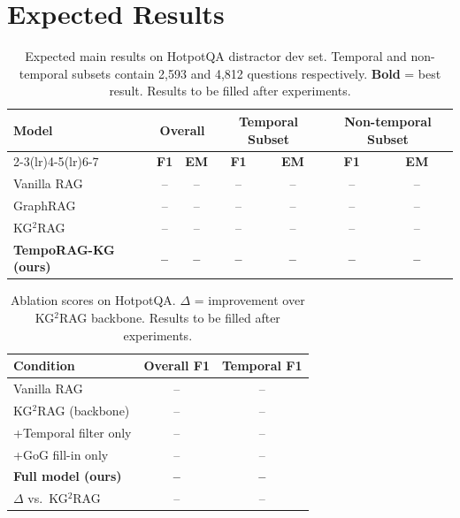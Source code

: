 \documentclass[11pt]{article}
\begin{document}
\section{Expected Results}

\begin{table}[t]
  \centering
  \small
  \begin{tabular}{lcccccc}
    \toprule
    \multirow{2}{*}{\textbf{Model}} &
    \multicolumn{2}{c}{\textbf{Overall}} &
    \multicolumn{2}{c}{\textbf{Temporal Subset}} &
    \multicolumn{2}{c}{\textbf{Non-temporal Subset}} \\
    \cmidrule(lr){2-3}\cmidrule(lr){4-5}\cmidrule(lr){6-7}
    & \textbf{F1} & \textbf{EM}
    & \textbf{F1} & \textbf{EM}
    & \textbf{F1} & \textbf{EM} \\
    \midrule
    Vanilla RAG                     & -- & -- & -- & -- & -- & -- \\
    GraphRAG \cite{edge2024graphrag} & -- & -- & -- & -- & -- & -- \\
    KG$^2$RAG \cite{zhu2025kg2rag}  & -- & -- & -- & -- & -- & -- \\
    \midrule
    \textbf{TempoRAG-KG (ours)}     & \textbf{--} & \textbf{--}
                                    & \textbf{--} & \textbf{--}
                                    & \textbf{--} & \textbf{--} \\
    \bottomrule
  \end{tabular}
  \caption{Expected main results on HotpotQA distractor dev set.
  Temporal and non-temporal subsets contain 2,593 and 4,812 questions
  respectively. \textbf{Bold} = best result. Results to be filled
  after experiments.}
  \label{tab:main_results}
\end{table}

\begin{table}[t]
  \centering
  \small
  \begin{tabular}{lcc}
    \toprule
    \textbf{Condition} & \textbf{Overall F1} & \textbf{Temporal F1} \\
    \midrule
    Vanilla RAG                     & -- & -- \\
    KG$^2$RAG (backbone)            & -- & -- \\
    \quad +Temporal filter only     & -- & -- \\
    \quad +GoG fill-in only         & -- & -- \\
    \quad \textbf{Full model (ours)}& \textbf{--} & \textbf{--} \\
    \midrule
    $\Delta$ vs.\ KG$^2$RAG        & --  & -- \\
    \bottomrule
  \end{tabular}
  \caption{Ablation scores on HotpotQA.
  $\Delta$ = improvement over KG$^2$RAG backbone.
  Results to be filled after experiments.}
  \label{tab:ablation_scores}
\end{table}
\end{document}
